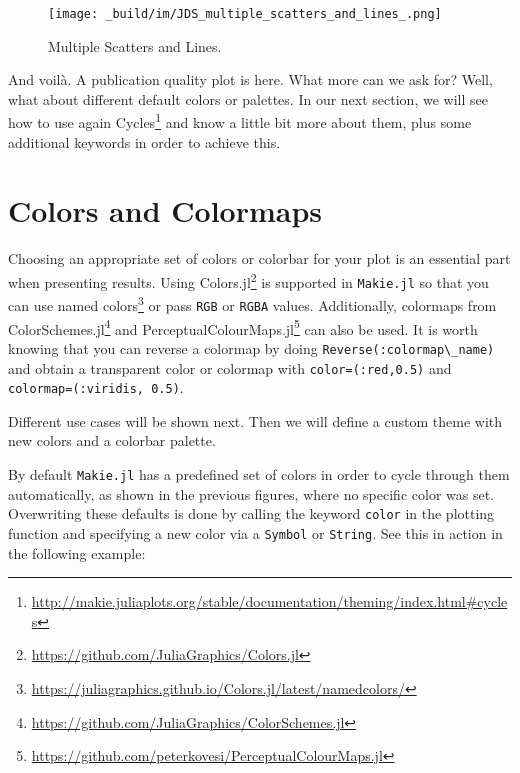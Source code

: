 \documentclass[
  notoc %
]{tufte-book}
\DeclareRobustCommand{\href}[2]{#2\footnote{\url{#1}}}
\newcommand{\passthrough}[1]{#1}
\begin{document}
\begin{figure}
\hypertarget{fig:multiple_scatters_and_lines}{%
\centering
\texttt{[image: \_build/im/JDS\_multiple\_scatters\_and\_lines\_.png]}
\caption{Multiple Scatters and
Lines.}\label{fig:multiple_scatters_and_lines}
}
\end{figure}

And voilà. A publication quality plot is here. What more can we ask for?
Well, what about different default colors or palettes. In our next
section, we will see how to use again
\href{http://makie.juliaplots.org/stable/documentation/theming/index.html\#cycles}{Cycles}
and know a little bit more about them, plus some additional keywords in
order to achieve this.

\hypertarget{sec:makie_colors}{%
\section{Colors and Colormaps}\label{sec:makie_colors}}

Choosing an appropriate set of colors or colorbar for your plot is an
essential part when presenting results. Using
\href{https://github.com/JuliaGraphics/Colors.jl}{Colors.jl} is
supported in \passthrough{\lstinline!Makie.jl!} so that you can use
\href{https://juliagraphics.github.io/Colors.jl/latest/namedcolors/}{named
colors} or pass \passthrough{\lstinline!RGB!} or
\passthrough{\lstinline!RGBA!} values. Additionally, colormaps from
\href{https://github.com/JuliaGraphics/ColorSchemes.jl}{ColorSchemes.jl}
and
\href{https://github.com/peterkovesi/PerceptualColourMaps.jl}{PerceptualColourMaps.jl}
can also be used. It is worth knowing that you can reverse a colormap by
doing \passthrough{\lstinline!Reverse(:colormap\_name)!} and obtain a
transparent color or colormap with
\passthrough{\lstinline!color=(:red,0.5)!} and
\passthrough{\lstinline!colormap=(:viridis, 0.5)!}.

Different use cases will be shown next. Then we will define a custom
theme with new colors and a colorbar palette.

By default \passthrough{\lstinline!Makie.jl!} has a predefined set of
colors in order to cycle through them automatically, as shown in the
previous figures, where no specific color was set. Overwriting these
defaults is done by calling the keyword \passthrough{\lstinline!color!}
in the plotting function and specifying a new color via a
\passthrough{\lstinline!Symbol!} or \passthrough{\lstinline!String!}.
See this in action in the following example:
\end{document}
